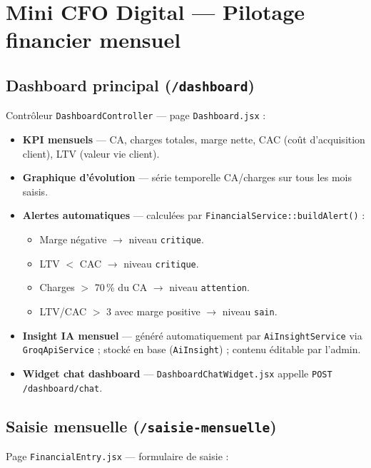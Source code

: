 \documentclass[11pt,a4paper]{report}
\newcommand{\route}[1]{\texttt{\small #1}}
\newcommand{\ctrl}[1]{\texttt{\small #1}}
\newcommand{\svc}[1]{\texttt{\small #1}}
\newcommand{\model}[1]{\texttt{\small #1}}
\newcommand{\feat}[1]{\textbf{#1}}
\begin{document}
\chapter{Mini CFO Digital — Pilotage financier mensuel}

\section{Dashboard principal (\route{/dashboard})}

Contrôleur \ctrl{DashboardController} — page \texttt{Dashboard.jsx} :

\begin{itemize}[leftmargin=*]
    \item \feat{KPI mensuels} — CA, charges totales, marge nette, CAC (coût d'acquisition client), LTV (valeur vie client).
    \item \feat{Graphique d'évolution} — série temporelle CA/charges sur tous les mois saisis.
    \item \feat{Alertes automatiques} — calculées par \svc{FinancialService::buildAlert()} :
    \begin{itemize}
        \item Marge négative $\rightarrow$ niveau \texttt{critique}.
        \item LTV $<$ CAC $\rightarrow$ niveau \texttt{critique}.
        \item Charges $>$ 70\,\% du CA $\rightarrow$ niveau \texttt{attention}.
        \item LTV/CAC $>$ 3 avec marge positive $\rightarrow$ niveau \texttt{sain}.
    \end{itemize}
    \item \feat{Insight IA mensuel} — généré automatiquement par \svc{AiInsightService} via \svc{GroqApiService} ; stocké en base (\model{AiInsight}) ; contenu éditable par l'admin.
    \item \feat{Widget chat dashboard} — \texttt{DashboardChatWidget.jsx} appelle \route{POST /dashboard/chat}.
\end{itemize}

\section{Saisie mensuelle (\route{/saisie-mensuelle})}

Page \texttt{FinancialEntry.jsx} — formulaire de saisie :
\end{document}
